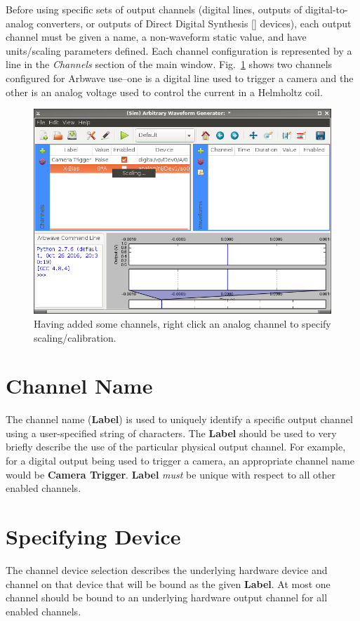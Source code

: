 \thispagestyle{fancy}
\pagestyle{fancy}

Before using specific sets of output channels (digital lines, outputs of
digital-to-analog converters, or outputs of Direct Digital Synthesis
[] devices), each output channel must be given a name, a non-waveform
static value, and have units/scaling parameters defined.  Each channel
configuration is represented by a line in the \textit{Channels} section of the
main window.  Fig.~\ref{fig:channel:select-scaling} shows two channels
configured for Arbwave use--one is a digital line used to trigger a camera and
the other is an analog voltage used to control the current in a Helmholtz coil.

\begin{figure}[ht!]
  \centerline{\includegraphics[width=.8\textwidth]{figures/select-scaling}}
  \caption{Having added some channels, right click an analog channel to
  specify scaling/calibration.}
  \label{fig:channel:select-scaling}
\end{figure}

\section{Channel Name}\label{sec:channels:chname}
The channel name (\textbf{Label}) is used to uniquely identify a specific output
channel using a user-specified string of characters.  The \textbf{Label} should
be used to very briefly describe the use of the particular physical output
channel.  For example, for a digital output being used to trigger a camera, an
appropriate channel name would be \textbf{Camera Trigger}.  \textbf{Label}
\textit{must} be unique with respect to all other enabled channels.

\section{Specifying Device}\label{sec:channels:dev}
The channel device selection describes the underlying hardware device and
channel on that device that will be bound as the given \textbf{Label}.
At most one channel should be bound to an underlying hardware output channel for
all enabled channels.


